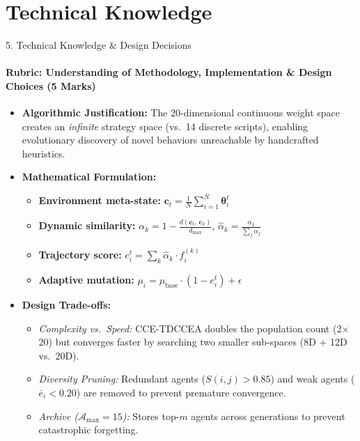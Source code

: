 \documentclass[aspectratio=169, 11pt]{beamer}
\begin{document}
\section{Technical Knowledge}
\begin{frame}{5. Technical Knowledge \& Design Decisions}
    \framesubtitle{Rubric: Understanding of Methodology, Implementation \& Design Choices (5 Marks)}
    \begin{itemize}\small
        \item \textbf{Algorithmic Justification:} The 20-dimensional continuous weight space creates an \textit{infinite} strategy space (vs.\ 14 discrete scripts), enabling evolutionary discovery of novel behaviors unreachable by handcrafted heuristics.

        \item \textbf{Mathematical Formulation:}
        \begin{itemize}\footnotesize
            \item \textbf{Environment meta-state:} $\mathbf{c}_t = \frac{1}{N}\sum_{i=1}^{N}\boldsymbol{\theta}_i^t$
            \item \textbf{Dynamic similarity:} $\alpha_k = 1 - \frac{d(\mathbf{c}_t,\,\mathbf{c}_k)}{d_{\max}}$, \quad $\hat{\alpha}_k = \frac{\alpha_k}{\sum_j \alpha_j}$
            \item \textbf{Trajectory score:} $e_i^t = \sum_k \hat{\alpha}_k \cdot f_i^{(k)}$
            \item \textbf{Adaptive mutation:} $\mu_i = \mu_{\text{base}} \cdot (1 - e_i^t) + \epsilon$
        \end{itemize}

        \item \textbf{Design Trade-offs:}
        \begin{itemize}\footnotesize
            \item \textit{Complexity vs.\ Speed:} CCE-TDCCEA doubles the population count (2$\times$20) but converges faster by searching two smaller sub-spaces (8D + 12D vs.\ 20D).
            \item \textit{Diversity Pruning:} Redundant agents ($S(i,j) > 0.85$) and weak agents ($\bar{e}_i < 0.20$) are removed to prevent premature convergence.
            \item \textit{Archive ($\mathcal{A}_{\max}=15$):} Stores top-$m$ agents across generations to prevent catastrophic forgetting.
        \end{itemize}
    \end{itemize}
\end{frame}
\end{document}
